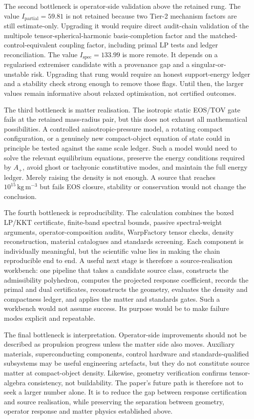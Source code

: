 \documentclass[11pt,a4paper]{article}
\begin{document}
The second bottleneck is operator-side validation above the retained rung. The value $I_{\mathrm{partial}}=59.81$ is not retained because two Tier-2 mechanism factors are still estimate-only. Upgrading it would require direct audit-chain validation of the multipole tensor-spherical-harmonic basis-completion factor and the matched-control-equivalent coupling factor, including primal LP tests and ledger reconciliation. The value $I_{\mathrm{spec}}=133.99$ is more remote. It depends on a regularised extremiser candidate with a provenance gap and a singular-or-unstable risk. Upgrading that rung would require an honest support-energy ledger and a stability check strong enough to remove those flags. Until then, the larger values remain informative about relaxed optimisation, not certified outcomes.

The third bottleneck is matter realisation. The isotropic static EOS/TOV gate fails at the retained mass-radius pair, but this does not exhaust all mathematical possibilities. A controlled anisotropic-pressure model, a rotating compact configuration, or a genuinely new compact-object equation of state could in principle be tested against the same scale ledger. Such a model would need to solve the relevant equilibrium equations, preserve the energy conditions required by $A_{+}$, avoid ghost or tachyonic constitutive modes, and maintain the full energy ledger. Merely raising the density is not enough. A source that reaches $10^{15}\,\mathrm{kg\,m^{-3}}$ but fails EOS closure, stability or conservation would not change the conclusion.

The fourth bottleneck is reproducibility. The calculation combines the boxed LP/KKT certificate, finite-band spectral bounds, passive spectral-weight arguments, operator-composition audits, WarpFactory tensor checks, density reconstruction, material catalogues and standards screening. Each component is individually meaningful, but the scientific value lies in making the chain reproducible end to end. A useful next stage is therefore a source-realisation workbench: one pipeline that takes a candidate source class, constructs the admissibility polyhedron, computes the projected response coefficient, records the primal and dual certificates, reconstructs the geometry, evaluates the density and compactness ledger, and applies the matter and standards gates. Such a workbench would not assume success. Its purpose would be to make failure modes explicit and repeatable.

The final bottleneck is interpretation. Operator-side improvements should not be described as propulsion progress unless the matter side also moves. Auxiliary materials, superconducting components, control hardware and standards-qualified subsystems may be useful engineering artefacts, but they do not constitute source matter at compact-object density. Likewise, geometry verification confirms tensor-algebra consistency, not buildability. The paper’s future path is therefore not to seek a larger number alone. It is to reduce the gap between response certification and source realisation, while preserving the separation between geometry, operator response and matter physics established above.
\end{document}
